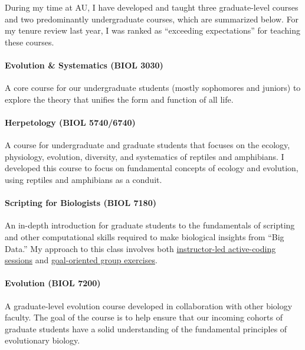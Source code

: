 During my time at AU,
I have developed and taught three graduate-level courses
and two predominantly undergraduate courses,
which are summarized below.
For my tenure review last year, I was ranked as ``exceeding
expectations'' for teaching these courses.

\paragraph*{Evolution \& Systematics (BIOL 3030)}
A core course for our undergraduate students (mostly sophomores and juniors) to
explore the theory that unifies the form and function of all life.

\paragraph*{Herpetology (BIOL 5740/6740)}
A course for undergraduate and graduate students that focuses on the ecology,
physiology, evolution, diversity, and systematics of reptiles and amphibians.
I developed this course to focus on fundamental concepts of ecology and
evolution, using reptiles and amphibians as a conduit.

\paragraph*{Scripting for Biologists (BIOL 7180)}
An in-depth introduction for graduate students to the fundamentals of scripting
and other computational skills required to make biological insights from ``Big
Data.''
My approach to this class involves both
\href{http://phyletica.org/slides/python/intro/}{instructor-led active-coding
    sessions}
and
\href{https://github.com/joaks1/python-translation-project}{goal-oriented group
    exercises}.

\paragraph*{Evolution (BIOL 7200)}
A graduate-level evolution course developed in collaboration with other biology
faculty.
The goal of the course is to help ensure that our incoming cohorts of graduate
students have a solid understanding of the fundamental principles of
evolutionary biology.

